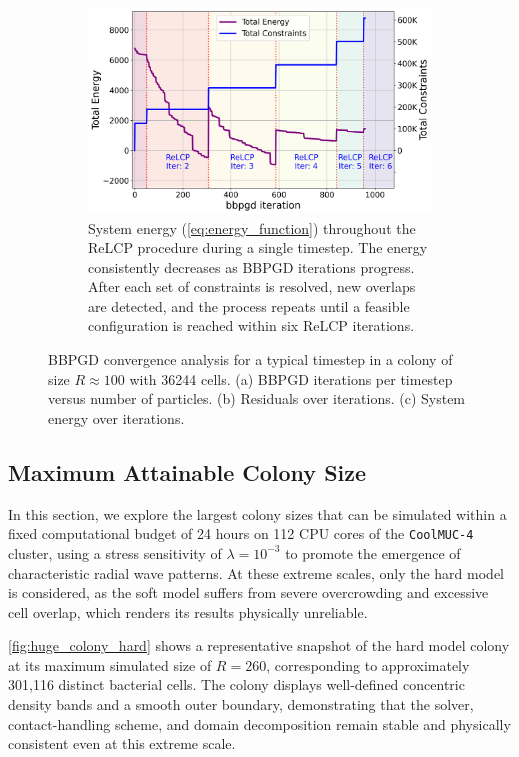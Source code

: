 \documentclass[conference]{IEEEtran}
\begin{document}
\begin{figure}[H]
    \begin{subfigure}[b]{\linewidth}
        \centering
        \includegraphics[width=\linewidth]{figures/bbpgd/bbpgd_total_energy.png}
        \caption{System energy (\autoref{eq:energy_function}) throughout the ReLCP procedure during a single timestep. The energy consistently decreases as BBPGD iterations progress. After each set of constraints is resolved, new overlaps are detected, and the process repeats until a feasible configuration is reached within six ReLCP iterations.}
        \label{fig:bbpgd_energy}
    \end{subfigure}

    \caption{BBPGD convergence analysis for a typical timestep in a colony of size $R \approx 100$ with 36244 cells. (a) BBPGD iterations per timestep versus number of particles. (b) Residuals over iterations. (c) System energy over iterations.}
    \label{fig:bbpgd_analysis}
\end{figure}


\subsection{Maximum Attainable Colony Size}
\label{sec:maximum_colony_size}

In this section, we explore the largest colony sizes that can be simulated within a fixed computational budget of 24 hours on 112 CPU cores of the \texttt{CoolMUC-4} cluster, using a stress sensitivity of $\lambda = 10^{-3}$ to promote the emergence of characteristic radial wave patterns. At these extreme scales, only the hard model is considered, as the soft model suffers from severe overcrowding and excessive cell overlap, which renders its results physically unreliable.

\autoref{fig:huge_colony_hard} shows a representative snapshot of the hard model colony at its maximum simulated size of $R = 260$, corresponding to approximately 301{,}116 distinct bacterial cells. The colony displays well-defined concentric density bands and a smooth outer boundary, demonstrating that the solver, contact-handling scheme, and domain decomposition remain stable and physically consistent even at this extreme scale.
\end{document}
